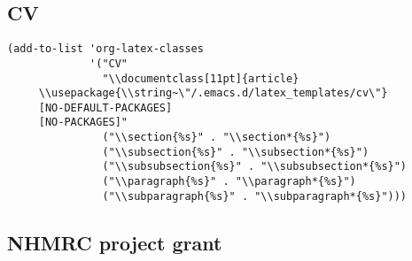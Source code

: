 \documentclass[12pt]{article}
\begin{document}
\subsection{CV}
\label{sec:orgd2ceeb1}

\begin{verbatim}
(add-to-list 'org-latex-classes
             '("CV"
               "\\documentclass[11pt]{article}
     \\usepackage{\\string~\"/.emacs.d/latex_templates/cv\"}
     [NO-DEFAULT-PACKAGES]
     [NO-PACKAGES]"
               ("\\section{%s}" . "\\section*{%s}")
               ("\\subsection{%s}" . "\\subsection*{%s}")
               ("\\subsubsection{%s}" . "\\subsubsection*{%s}")
               ("\\paragraph{%s}" . "\\paragraph*{%s}")
               ("\\subparagraph{%s}" . "\\subparagraph*{%s}")))
\end{verbatim}

\subsection{NHMRC project grant}
\label{sec:orge0f613a}
\end{document}
